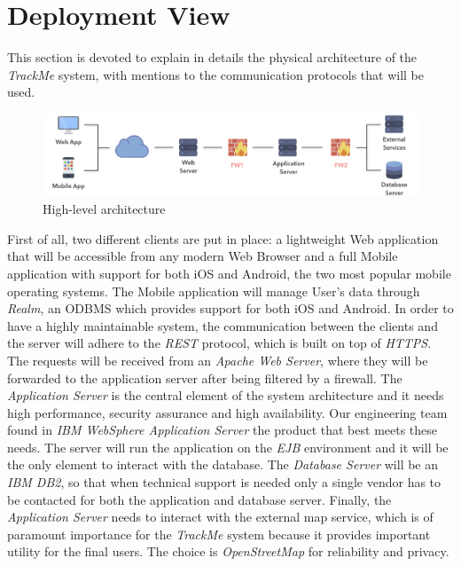 \section{Deployment View}

This section is devoted to explain in details the physical architecture of the \textit{TrackMe} system, with mentions to the communication protocols that will be used.


\begin{figure}[H]
\includegraphics[scale=0.32,keepaspectratio]{./Pictures/high-level-firewall.png}
\centering
\caption{High-level architecture}
\end{figure}

First of all, two different clients are put in place: a lightweight Web application that will be accessible from any modern Web Browser and a full Mobile application with support for both iOS and Android, the two most popular mobile operating systems. The Mobile application will manage User's data through \textit{Realm}, an ODBMS which provides support for both iOS and Android. In order to have a highly maintainable system, the communication between the clients and the server will adhere to the \textit{REST} protocol, which is built on top of \textit{HTTPS}. 
The requests will be received from an \textit{Apache Web Server}, where they will be forwarded to the application server after being filtered by a firewall.
The \textit{Application Server} is the central element of the system architecture and it needs high performance, security assurance and high availability. Our engineering team found in \textit{IBM WebSphere Application Server} the product that best meets these needs. The server will run the application on the \textit{EJB} environment and it will be the only element to interact with the database. The \textit{Database Server} will be an \textit{IBM DB2}, so that when technical support is needed only a single vendor has to be contacted for both the application and database server.
Finally, the \textit{Application Server} needs to interact with the external map service, which is of paramount importance for the \textit{TrackMe} system because it provides important utility for the final users. The choice is \textit{OpenStreetMap} for reliability and privacy.

